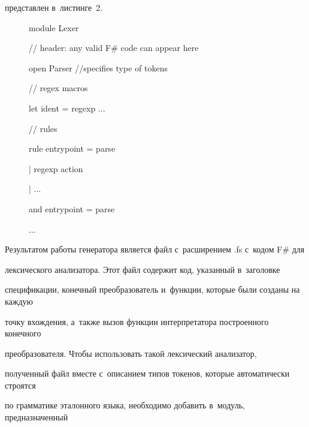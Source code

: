 представлен в~листинге~2.





\begin{figure}[b] %


\begin{center}


\begin{boxedverbatim}


{


module Lexer


// header: any valid F# code can appear here


open Parser //specifies type of tokens


}


// regex macros


let ident = regexp ...


// rules


rule entrypoint = parse


| regexp { action }


| ...


and entrypoint = parse


...


\end{boxedverbatim}


\end{center}


\vspace*{-6pt}




\end{figure}





Результатом работы генератора является файл с~расширением .fs с~кодом F\# для 


лексического анализатора. Этот файл содержит код, указанный в~заголовке 


спецификации, конечный преобразователь и~функции, которые были созданы на каждую 


точку вхождения, а~также вызов функции интерпретатора построенного конечного 


преобразователя. Чтобы использовать такой лексический анализатор, 


полученный файл вместе с~описанием типов токенов, которые автоматически строятся 


по грамматике эталонного языка, необходимо добавить в~модуль, предназначенный 


